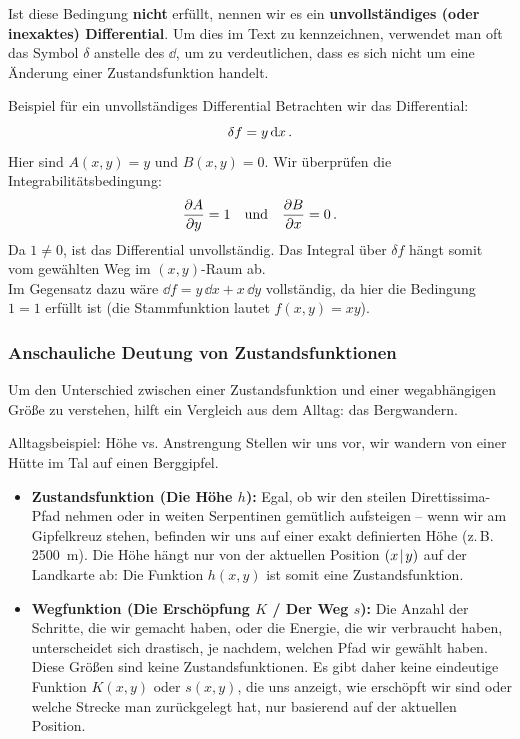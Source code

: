 Ist diese Bedingung \textbf{nicht} erfüllt, nennen wir es ein \textbf{unvollständiges (oder inexaktes) Differential}. Um dies im Text zu kennzeichnen, verwendet man oft das Symbol $\delta$ anstelle des $\dd$, um zu verdeutlichen, dass es sich nicht um eine Änderung einer Zustandsfunktion handelt.

\begin{examplebox}{Beispiel für ein unvollständiges Differential}
Betrachten wir das Differential:
\begin{equation}\label{eq: bsp_unvollst_diff}
    \delta f = y \, \mathrm{d} x \,.
\end{equation}
Hier sind $A(x,y) = y$ und $B(x,y) = 0$. Wir überprüfen die Integrabilitätsbedingung:
\begin{equation}
    \frac{\partial A}{\partial y} = 1 \quad \text{und} \quad \frac{\partial B}{\partial x} = 0 \,.
\end{equation}
Da $1 \neq 0$, ist das Differential unvollständig. Das Integral über $\delta f$ hängt somit vom gewählten Weg im $(x,y)$-Raum ab.\\

Im Gegensatz dazu wäre $\dd f = y \, \dd x + x \, \dd y$ vollständig, da hier die Bedingung $1 = 1$ erfüllt ist (die Stammfunktion lautet $f(x,y) = xy$).
\end{examplebox}


\subsubsection{Anschauliche Deutung von Zustandsfunktionen}\label{subsubsec: deutung_zustandsfunktion}
Um den Unterschied zwischen einer Zustandsfunktion und einer wegabhängigen Größe zu verstehen, hilft ein Vergleich aus dem Alltag: das Bergwandern.

\begin{examplebox}{Alltagsbeispiel: Höhe vs. Anstrengung}
    Stellen wir uns vor, wir wandern von einer Hütte im Tal auf einen Berggipfel.
    \begin{itemize}
        \item \textbf{Zustandsfunktion (Die Höhe $h$):} Egal, ob wir den steilen Direttissima-Pfad nehmen oder in weiten Serpentinen gemütlich aufsteigen – wenn wir am Gipfelkreuz stehen, befinden wir uns auf einer exakt definierten Höhe (z.\,B. \SI{2500}{\meter}). Die Höhe hängt nur von der aktuellen Position $(x\!\mid\! y)$ auf der Landkarte ab: Die Funktion $h(x,y)$ ist somit eine Zustandsfunktion.
        \item \textbf{Wegfunktion (Die Erschöpfung $K$ / Der Weg $s$):} Die Anzahl der Schritte, die wir gemacht haben, oder die Energie, die wir verbraucht haben, unterscheidet sich drastisch, je nachdem, welchen Pfad wir gewählt haben. Diese Größen sind keine Zustandsfunktionen. Es gibt daher keine eindeutige Funktion $K(x,y)$ oder $s(x,y)$, die uns anzeigt, wie erschöpft wir sind oder welche Strecke man zurückgelegt hat, nur basierend auf der aktuellen Position.
    \end{itemize}
\end{examplebox}

